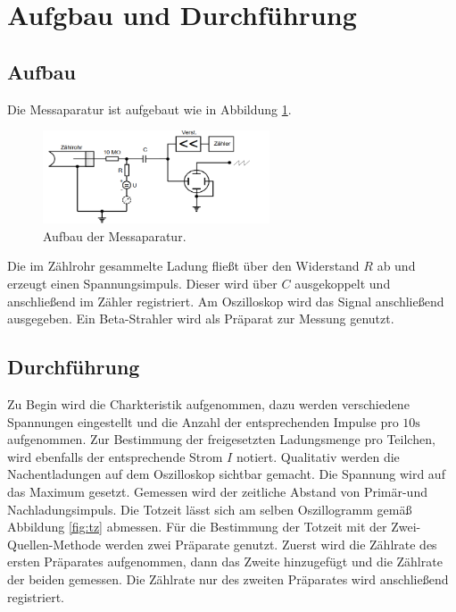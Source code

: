 \section{Aufgbau und Durchführung}
\label{sec:Durchführung}
\subsection{Aufbau}
Die Messaparatur ist aufgebaut wie in Abbildung \ref{fig:aufbau}.
\begin{figure}
  \centering
  \includegraphics[width=0.6\textwidth]{aufbau.PNG}
  \caption{Aufbau der Messaparatur.}
  \label{fig:aufbau}
\end{figure}
Die im Zählrohr gesammelte Ladung fließt über den Widerstand $R$ ab und erzeugt einen Spannungsimpuls. Dieser wird über $C$ ausgekoppelt und
anschließend im Zähler registriert. Am Oszilloskop wird das Signal anschließend ausgegeben. Ein Beta-Strahler wird als Präparat
zur Messung genutzt.
\subsection{Durchführung}
Zu Begin wird die Charkteristik aufgenommen, dazu werden verschiedene Spannungen eingestellt und die Anzahl der entsprechenden
Impulse pro $10\si{\second}$ aufgenommen. Zur Bestimmung der freigesetzten Ladungsmenge pro Teilchen, wird ebenfalls der entsprechende
Strom $I$ notiert.
Qualitativ werden die Nachentladungen auf dem Oszilloskop sichtbar gemacht. Die Spannung wird auf das Maximum gesetzt. Gemessen
wird der zeitliche Abstand von Primär-und Nachladungsimpuls. Die Totzeit lässt sich am selben
Oszillogramm gemäß Abbildung \ref{fig:tz} abmessen.
Für die Bestimmung der Totzeit mit der Zwei-Quellen-Methode werden zwei Präparate genutzt. Zuerst wird die Zählrate
des ersten Präparates aufgenommen, dann das Zweite hinzugefügt und die Zählrate der beiden gemessen. Die Zählrate nur des zweiten Präparates
wird anschließend registriert.
